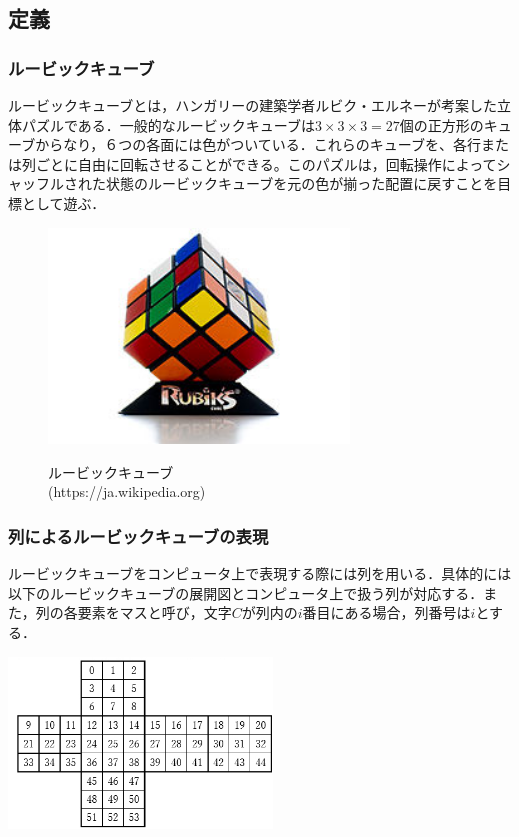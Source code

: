 \documentclass[titlepage]{jarticle}
\begin{document}
\subsection{定義}
\subsubsection{ルービックキューブ}
ルービックキューブとは，ハンガリーの建築学者ルビク・エルネーが考案した立体パズルである．一般的なルービックキューブは\(3\times 3\times 3=27\)個の正方形のキューブからなり，６つの各面には色がついている．これらのキューブを、各行または列ごとに自由に回転させることができる。このパズルは，回転操作によってシャッフルされた状態のルービックキューブを元の色が揃った配置に戻すことを目標として遊ぶ．\\

\begin{figure}
  \centering
  \includegraphics[width=8cm]{./tex_pic/rubik-cube.jpg}\\
  \caption{ルービックキューブ\\(https://ja.wikipedia.org)}
\end{figure}

\subsubsection{列によるルービックキューブの表現}
ルービックキューブをコンピュータ上で表現する際には列を用いる．具体的には以下のルービックキューブの展開図とコンピュータ上で扱う列が対応する．また，列の各要素をマスと呼び，文字\(C\)が列内の\(i\)番目にある場合，列番号は\(i\)とする．\\
\begin{center}
  \includegraphics[width=7cm]{./tex_pic/seq.jpg}\\
\end{center}
\end{document}
